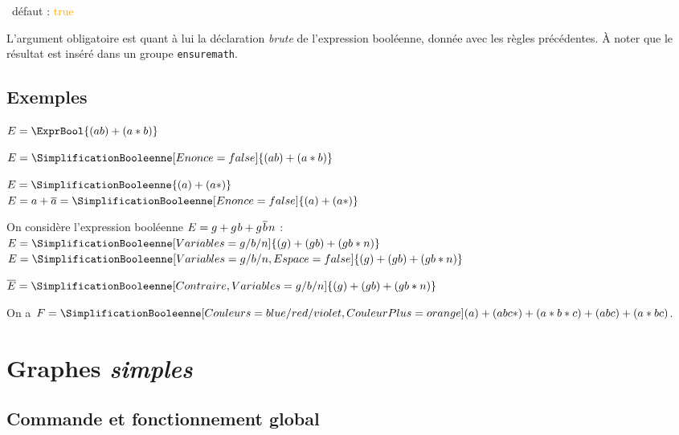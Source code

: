 \documentclass[french,a4paper,11pt]{article}
\newcommand\Cle[1]{{\small\sffamily\textlangle \textcolor{orange}{#1}\textrangle}}
\begin{document}
{{\begin{tipblock}
\begin{itemize}
	\hfill~défaut : \Cle{true}
\end{itemize}

L'argument obligatoire est quant à lui la déclaration \textit{brute} de l'expression booléenne, donnée avec les règles précédentes. À noter que le résultat est inséré dans un groupe \texttt{ensuremath}.
\end{tipblock}

\subsection{Exemples}

\begin{DemoCode}
$E = \ExprBool{(ab)+(a*b)}$

$E = \SimplificationBooleenne[Enonce=false]{(ab)+(a*b)}$
\end{DemoCode}

\begin{DemoCode}
$E = \SimplificationBooleenne{(a)+(a*)}$\\
$E = a + \overline{a} = \SimplificationBooleenne[Enonce=false]{(a)+(a*)}$
\end{DemoCode}

\begin{DemoCode}
On considère l'expression booléenne $E= g + g\mkern1.5mu\relax b + g\mkern1.5mu\relax\overline{b}\mkern1.5mu\relax n$ :\\
$E = \SimplificationBooleenne[Variables=g/b/n]{(g)+(gb)+(gb*n)}$\\
$E = \SimplificationBooleenne[Variables=g/b/n,Espace=false]{(g)+(gb)+(gb*n)}$
\end{DemoCode}

\begin{DemoCode}
$\overline{E} = \SimplificationBooleenne[Contraire,Variables=g/b/n]{(g)+(gb)+(gb*n)}$
\end{DemoCode}

\begin{DemoCode}
On a $F = \SimplificationBooleenne%
  [Couleurs={blue/red/violet},CouleurPlus=orange]%
  {(a)+(abc*)+(a*b*c)+(abc)+(a*bc)}$.
\end{DemoCode}

\pagebreak

\section{Graphes \textit{simples}}

\subsection{Commande et fonctionnement global}

}}
\end{document}
